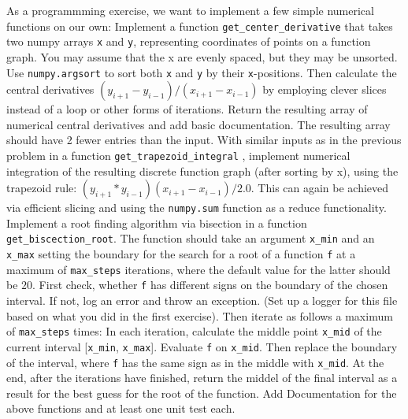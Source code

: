 \documentclass[]{erlangen-problemset}
\begin{document}
\begin{problem}[title={Rebuilding numpy and scipy functionality ourselves}]
As a programmming exercise, we want to implement a few simple numerical functions on our own:
\noindent
\Question Implement a function  \texttt{get\_center\_derivative} that takes two numpy arrays \texttt{x} and \texttt{y}, representing coordinates of points on a function graph. 
You may assume that the x are evenly spaced, but they may be unsorted.
Use  \texttt{numpy.argsort} to sort both  \texttt{x} and  \texttt{y} by their  \texttt{x}-positions.
Then calculate the central derivatives $(y_{i+1}-y_{i-1})/(x_{i+1}-x_{i-1})$ by employing clever slices instead of a loop or other forms of iterations.
Return the resulting array of numerical central derivatives and add basic documentation.
The resulting array should have 2 fewer entries than the input.
\Question With similar inputs as in the previous problem in a function \texttt{get\_trapezoid\_integral} , implement numerical integration of the resulting discrete function graph (after sorting by x), using the trapezoid rule: $(y_{i+1}*y_{i-1})(x_{i+1}-x_{i-1})/2.0$.
This can again be achieved via efficient slicing and using the \texttt{numpy.sum} function as a reduce functionality.
\Question Implement a root finding algorithm via bisection in a function \texttt{get\_biscection\_root}. 
The function should take an argument  \texttt{x\_min} and an  \texttt{x\_max} setting the boundary for the search for a root of a function \texttt{f} at a maximum of \texttt{max\_steps} iterations, where the default value for the latter should be $20$.
First check, whether  \texttt{f} has different signs on the boundary of the chosen interval.
If not, log an error and throw an exception. (Set up a logger for this file based on what you did in the first exercise).
Then iterate as follows a maximum of \texttt{max\_steps} times:
In each iteration, calculate the middle point  \texttt{x\_mid} of the current interval  [\texttt{x\_min}, \texttt{x\_max}]. 
Evaluate  \texttt{f} on \texttt{x\_mid}.
Then replace the boundary of the interval, where  \texttt{f} has the same sign as in the middle with  \texttt{x\_mid}.
At the end, after the iterations have finished, return the middel of the final interval as a result for the best guess for the root of the function.
\Question Add Documentation for the above functions and at least one unit test each.
\end{problem}
\end{document}
